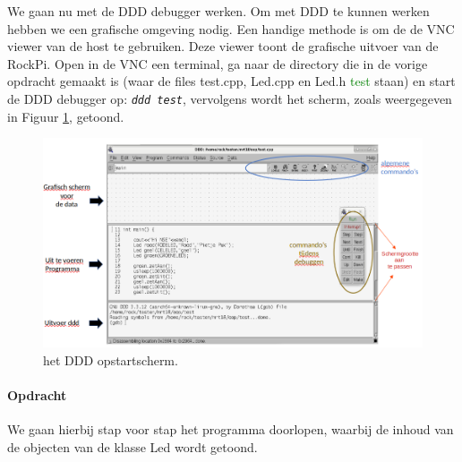 We gaan nu met de DDD debugger werken.
Om met DDD te kunnen werken hebben we een grafische omgeving nodig. Een handige methode is om de de VNC viewer van de host te gebruiken. Deze viewer toont de grafische uitvoer van de RockPi. Open in de VNC een terminal, ga naar de directory die in de vorige opdracht gemaakt is (waar de files test.cpp, Led.cpp en Led.h \textcolor{green}{test} staan) en start de DDD debugger op:
\texttt{\textit{ddd test}}, vervolgens wordt het scherm, zoals weergegeven in Figuur \ref{fig:dddscherm1}, getoond.
\begin{figure}[h!]
	\captionsetup{justification=centering}
	\includegraphics[width=0.8 \linewidth]{figuren/ddd_startup_screen}
	\centering
	\caption{het DDD opstartscherm.}
	\label{fig:dddscherm1}
\end{figure}

\paragraph{Opdracht}
We gaan hierbij stap voor stap het programma doorlopen, waarbij de inhoud van de objecten van de klasse Led wordt getoond.

